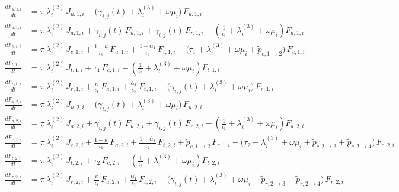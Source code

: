 \begin{align*}
\frac{dF_{u,1,i}}{dt}
  &= \pi\,\lambda_i^{(2)}\,J_{u,1,i}
     - \bigl(\gamma_{i,j}(t) + \lambda_i^{(3)} + \omega\mu_i\bigr)\,F_{u,1,i}
\\[0.8em]
\frac{dF_{a,1,i}}{dt}
  &= \pi\,\lambda_i^{(2)}\,J_{a,1,i}
     + \gamma_{i,j}(t)\,F_{u,1,i}
     + \gamma_{i,j}(t)\,F_{r,1,i}
     - \left(\frac{1}{\iota_1} + \lambda_i^{(3)} + \omega\mu_i\right)F_{a,1,i}
\\[0.8em]
\frac{dF_{c,1,i}}{dt}
  &= \pi\,\lambda_i^{(2)}\,J_{c,1,i}
     + \frac{1-\kappa}{\iota_1}\,F_{a,1,i}
     + \frac{1-\bar{\alpha}_1}{\iota_2}\,F_{t,1,i}
     - \bigl(\tau_1 + \lambda_i^{(3)} + \omega\mu_i + \tilde{p}_{c,1\to2}\bigr)\,F_{c,1,i}
\\[0.8em]
\frac{dF_{t,1,i}}{dt}
  &= \pi\,\lambda_i^{(2)}\,J_{t,1,i}
     + \tau_1\,F_{c,1,i}
     - \left(\frac{1}{\iota_2} + \lambda_i^{(3)} + \omega\mu_i\right)F_{t,1,i}
\\[0.8em]
\frac{dF_{r,1,i}}{dt}
  &= \pi\,\lambda_i^{(2)}\,J_{r,1,i}
     + \frac{\kappa}{\iota_1}\,F_{a,1,i}
     + \frac{\bar{\alpha}_1}{\iota_2}\,F_{t,1,i}
     - \bigl(\gamma_{i,j}(t) + \lambda_i^{(3)} + \omega\mu_i\bigr)\,F_{r,1,i}
\\[1.2em]
\frac{dF_{u,2,i}}{dt}
  &= \pi\,\lambda_i^{(2)}\,J_{u,2,i}
     - \bigl(\gamma_{i,j}(t) + \lambda_i^{(3)} + \omega\mu_i\bigr)\,F_{u,2,i}
\\[0.8em]
\frac{dF_{a,2,i}}{dt}
  &= \pi\,\lambda_i^{(2)}\,J_{a,2,i}
     + \gamma_{i,j}(t)\,F_{u,2,i}
     + \gamma_{i,j}(t)\,F_{r,2,i}
     - \left(\frac{1}{\iota_1} + \lambda_i^{(3)} + \omega\mu_i\right)F_{a,2,i}
\\[0.8em]
\frac{dF_{c,2,i}}{dt}
  &= \pi\,\lambda_i^{(2)}\,J_{c,2,i}
     + \frac{1-\kappa}{\iota_1}\,F_{a,2,i}
     + \frac{1-\bar{\alpha}_1}{\iota_2}\,F_{t,2,i}
     + \tilde{p}_{c,1\to2}\,F_{c,1,i}
     - \bigl(\tau_2 + \lambda_i^{(3)} + \omega\mu_i 
             + \tilde{p}_{c,2\to3} + \tilde{p}_{c,2\to4}\bigr)\,F_{c,2,i}
\\[0.8em]
\frac{dF_{t,2,i}}{dt}
  &= \pi\,\lambda_i^{(2)}\,J_{t,2,i}
     + \tau_2\,F_{c,2,i}
     - \left(\frac{1}{\iota_2} + \lambda_i^{(3)} + \omega\mu_i\right)F_{t,2,i}
\\[0.8em]
\frac{dF_{r,2,i}}{dt}
  &= \pi\,\lambda_i^{(2)}\,J_{r,2,i}
     + \frac{\kappa}{\iota_1}\,F_{a,2,i}
     + \frac{\bar{\alpha}_1}{\iota_2}\,F_{t,2,i}
     - \bigl(\gamma_{i,j}(t) + \lambda_i^{(3)} + \omega\mu_i
             + \tilde{p}_{r,2\to3} + \tilde{p}_{r,2\to4}\bigr)\,F_{r,2,i}

\end{align*}
